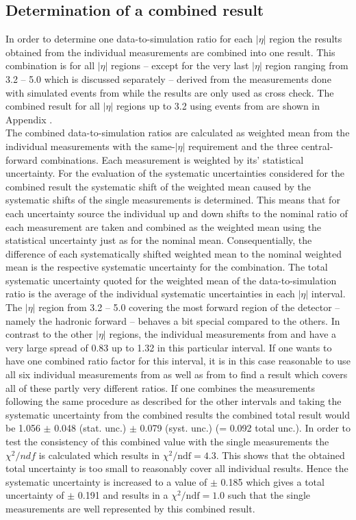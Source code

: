 \subsection{Determination of a combined result}
\label{subsec:jer_combination}
In order to determine one data-to-simulation ratio for each $|\eta|$ region the results obtained from the individual measurements are combined into one result. This combination is for all $|\eta|$ regions -- except for the very last $|\eta|$ region ranging from 3.2 -- 5.0 which is discussed separately -- derived from the measurements done with simulated events from \pythia while the \herwig results are only used as cross check. The combined result for all $|\eta|$ regions up to 3.2 using events from \herwig are shown in Appendix .\\
The combined data-to-simulation ratios are calculated as weighted mean from the individual measurements with the same-$|\eta|$ requirement and the three central-forward combinations. Each measurement is weighted by its' statistical uncertainty. For the evaluation of the systematic uncertainties considered for the combined result the systematic shift of the weighted mean caused by the systematic shifts of the single measurements is determined. This means that for each uncertainty source the individual up and down shifts to the nominal ratio of each measurement are taken and combined as the weighted mean using the statistical uncertainty just as for the nominal mean. Consequentially, the difference of each systematically shifted weighted mean to the nominal weighted mean is the respective systematic uncertainty for the combination. The total systematic uncertainty quoted for the weighted mean of the data-to-simulation ratio is the average of the individual systematic uncertainties in each $|\eta|$ interval.\\
The $|\eta|$ region from 3.2 -- 5.0 covering the most forward region of the detector -- namely the hadronic forward -- behaves a bit special compared to the others. In contrast to the other $|\eta|$ regions, the individual measurements from \pythia and \herwig have a very large spread of 0.83 up to 1.32 in this particular interval. If one wants to have one combined ratio factor for this interval, it is in this case reasonable to use all six individual measurements from \pythia as well as from \herwig to find a result which covers all of these partly very different ratios. If one combines the measurements following the same procedure as described for the other intervals and taking the systematic uncertainty from the combined \pythia results the combined total result would be 1.056 $\pm$ 0.048 (stat. unc.) $\pm$ 0.079 (syst. unc.) (= 0.092 total unc.). In order to test the consistency of this combined value with the single measurements the $\chi^2/ndf$ is calculated which results in  $\chi^2/\mathrm{ndf} = 4.3$. This shows that the obtained total uncertainty is too small to reasonably cover all individual results. Hence the systematic uncertainty is increased to a value of $\pm$ 0.185 which gives a total uncertainty of $\pm$ 0.191 and results in a $\chi^2/\mathrm{ndf} = 1.0$ such that the single measurements are well represented by this combined result.\\
